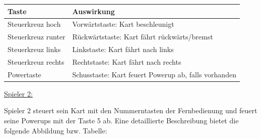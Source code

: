 \vspace{0.5cm}
\begin{tabular}{|l|l|}
\hline
\textbf{Taste} & \textbf{Auswirkung} \\ \hline
Steuerkreuz hoch & Vorwärtstaste: Kart beschleunigt \\ \hline
Steuerkreuz runter & Rückwärtstaste: Kart fährt rückwärts/bremst \\ \hline
Steuerkreuz links & Linkstaste: Kart fährt nach links \\ \hline
Steuerkreuz rechts & Rechtstaste: Kart fährt nach rechts \\ \hline
Powertaste & Schusstaste: Kart feuert Powerup ab, falls vorhanden \\ \hline  
\end{tabular} 
\vspace{0.5cm}

\underline{Spieler 2:}
 
Spieler 2 steuert sein Kart mit den Nummerntasten der Fernbedienung und feuert seine Powerups mit der Taste 5 ab. Eine detaillierte Beschreibung bietet die folgende Abbildung bzw. Tabelle:

